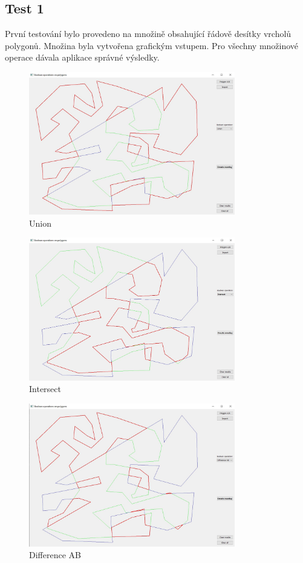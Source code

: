 \documentclass[a4paper, 12pt]{article}
\begin{document}
\subsection{Test 1}
První testování bylo provedeno na množině obsahující řádově desítky vrcholů polygonů. Množina byla vytvořena grafickým vstupem. Pro všechny množinové operace dávala aplikace správné výsledky.
 \begin{figure}[h!]
	\centering
	\includegraphics[width=9cm]{t1.jpg}
	\caption{Union}
\end{figure}

 \begin{figure}[h!]
	\centering
	\includegraphics[width=9cm]{t2.jpg}
	\caption{Intersect}
\end{figure}

 \begin{figure}[h!]
	\centering
	\includegraphics[width=9cm]{t3.jpg}
	\caption{Difference AB}
\end{figure}
\end{document}
